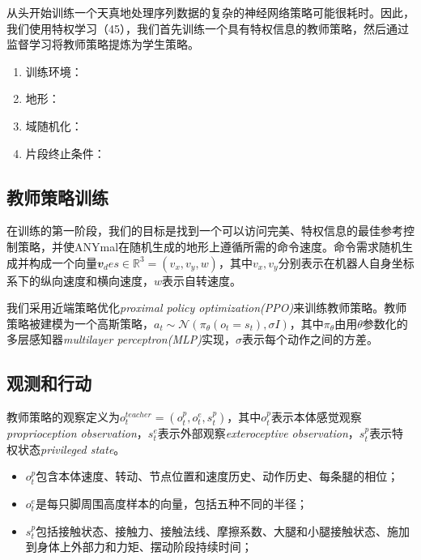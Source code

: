 从头开始训练一个天真地处理序列数据的复杂的神经网络策略可能很耗时\cite[p]{Lee_Hwangbo_Wellhausen_Koltun_Hutter_2020}。因此，我们使用特权学习（45），我们首先训练一个具有特权信息的教师策略，然后通过监督学习将教师策略提炼为学生策略\cite[p]{Chen_Zhou_Koltun_Krähenbühl_2019}。

\begin{enumerate}
  \item 训练环境：
  \item 地形：
  \item 域随机化：
  \item 片段终止条件：
\end{enumerate}

\subsection[教师策略训练]{教师策略训练}

在训练的第一阶段，我们的目标是找到一个可以访问完美、特权信息的最佳参考控制策略，并使ANYmal在随机生成的地形上遵循所需的命令速度。命令需求随机生成并构成一个向量$\mathbfit{v}_des\in \mathbb{R}^3=(v_x,v_y,w)$，其中$v_x, v_y$分别表示在机器人自身坐标系下的纵向速度和横向速度，$w$表示自转速度。

我们采用近端策略优化\emph{proximal policy optimization(PPO)}\cite[p]{Schulman_Wolski_Dhariwal_Radford_Klimov_2017}来训练教师策略。教师策略被建模为一个高斯策略，$a_t \sim \mathcal{N}(\pi_{\theta}(o_t=s_t),\sigma I)$，其中$\pi_{\theta}$由用$\theta$参数化的多层感知器\emph{multilayer perceptron(MLP)}实现，$\sigma$表示每个动作之间的方差。

\subsection[观测和行动]{观测和行动}

教师策略的观察定义为$o_t^{teacher}=(o_t^p, o_t^e, s_t^p)$，其中$o_t^p$表示本体感觉观察\emph{proprioception observation}，$s_t^e$表示外部观察\emph{exteroceptive observation}，$s_t^p$表示特权状态\emph{privileged state}。
\begin{itemize}
  \item $o_t^p$包含本体速度、转动、节点位置和速度历史、动作历史、每条腿的相位；
  \item $o_t^e$是每只脚周围高度样本的向量，包括五种不同的半径；
  \item $s_t^p$包括接触状态、接触力、接触法线、摩擦系数、大腿和小腿接触状态、施加到身体上外部力和力矩、摆动阶段持续时间；
\end{itemize}

